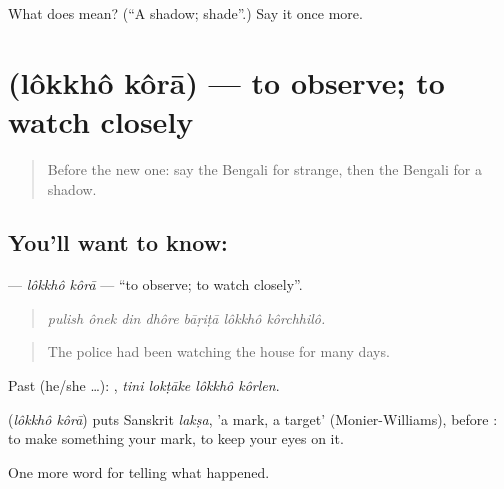 \begin{tcolorbox}[breakable,colback=teal!4,colframe=teal!35!black,title={Before you move on}]
What does  mean? (\textquotedblleft{}A shadow; shade\textquotedblright{}.) Say it once more.
\end{tcolorbox}
\section[\texorpdfstring{\bn{লক্ষ} \bn{করা} (lôkkhô kôrā)}{লক্ষ করা (lôkkhô kôrā)}]{  (lôkkhô kôrā) — to observe; to watch closely}

\label{lesson:BN-C286-lokkho-kora}



\begin{quote}
Before the new one: say the Bengali for strange, then the Bengali for a shadow.
\end{quote}

\subsection*{You'll want to know:  }
\textbf{ } — \emph{lôkkhô kôrā} — \textquotedblleft{}to observe; to watch closely\textquotedblright{}.

\begin{quote}
      
\end{quote}

\begin{quote}
\emph{pulish ônek din dhôre bāṛiṭā lôkkhô kôrchhilô.}
\end{quote}

\begin{quote}
The police had been watching the house for many days.
\end{quote}

Past (he/she …):    , \emph{tini lokṭāke lôkkhô kôrlen}.

\begin{cousinweb}
\textbf{ } (\emph{lôkkhô kôrā}) puts Sanskrit \emph{lakṣa}, 'a mark, a target' (Monier-Williams), before : to make something your mark, to keep your eyes on it.
\end{cousinweb}

\begin{grammarlens}[title={What you've built}]
One more word for telling what happened.
\end{grammarlens}

